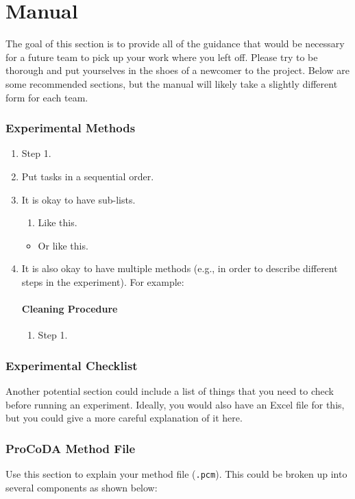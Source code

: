 \documentclass[a4paper]{article}
\begin{document}
\clearpage

\part*{Manual}
The goal of this section is to provide all of the guidance that would be necessary for a future team to pick up your work where you left off. Please try to be thorough and put yourselves in the shoes of a newcomer to the project. Below are some recommended sections, but the manual will likely take a slightly different form for each team.

\section*{Experimental Methods}
\begin{enumerate}	
\item Step 1.
\item Put tasks in a sequential order.
\item It is okay to have sub-lists.
	\begin{enumerate}
    \item Like this.
    \end{enumerate}
    \begin{itemize}
	\item Or like this.
	\end{itemize}
\item It is also okay to have multiple methods (e.g., in order to describe different steps in the experiment). For example:

\subsection*{Cleaning Procedure}
\begin{enumerate}
\item Step 1.
\end{enumerate}
\end{enumerate}

\section*{Experimental Checklist}
Another potential section could include a list of things that you need to check before running an experiment. Ideally, you would also have an Excel file for this, but you could give a more careful explanation of it here.

\section*{ProCoDA Method File}
Use this section to explain your method file (\texttt{.pcm}). This could be broken up into several components as shown below:
\end{document}
